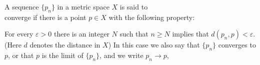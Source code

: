 \documentclass[a4paper,10pt]{article}
\begin{document}
A sequence $ \{p_n\} $ in a metric space $ X $ is said to \\
converge if there is a point $p \in X$ with the following property: 

For every $\varepsilon > 0$ 
there is an integer $ N $ 
such that $n \geq N$ 
implies that $d(p_n, p)< \varepsilon$. 
(Here $d$ denotes the distance in $X$)
In this case we also 
say that 
$ \{ p_n \} $ 
converges to $ p $, 
or that $ p $ is the limit of $\{p_n\}$, and we write $ p_n \to p $, 
\end{document}
